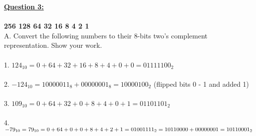 \documentclass[11pt]{article}
\begin{document}
\noindent \textbf{\ul{Question 3:}} \\
\\
\textbf{256 128 64 32 16 8 4 2 1} \\
A. Convert the following numbers to their 8-bits two's complement representation. Show your work. \\\\
1. $124_{10} = 0 + 64 + 32 + 16 + 8 + 4 + 0 + 0 = 01111100_{2}$\\ \\  
2. $-124_{10} = 10000011_{8} + 00000001_{8} = 10000100_{2}$ (flipped bits 0 - 1 and added 1)\\ \\
3. $109_{10} =  0 + 64 + 32 + 0 + 8 + 4 + 0 + 1 = 01101101_{2}$\\ \\
4. $-79_{10} = \\ 79_{10} = 0 + 64 + 0 + 0 + 8 + 4 + 2 + 1 = 01001111_{2} \\
= 10110000 + 00000001 = 10110001_{2} $\\ \\
\\
\end{document}
